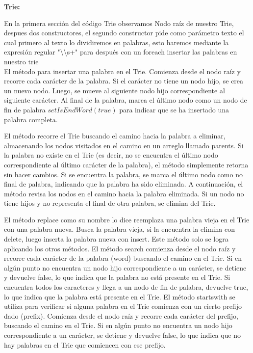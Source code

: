 \documentclass{article}
\begin{document}
	\begin{minipage}{\textwidth}	

		\textbf{Trie: }
		
		En la primera sección del código Trie observamos Nodo raíz de nuestro Trie, despues dos constructores, 
		el segundo constructor pide como parámetro texto el cual primero al texto lo dividiremos en palabras, 
		esto haremos mediante la expresión regular "\textbackslash\textbackslash s+" para después con un foreach insertar las palabras en nuestro trie
		\\El método para insertar una palabra en el Trie. Comienza desde el nodo raíz y recorre cada carácter de la palabra. 
		Si el carácter no tiene un nodo hijo, se crea un nuevo nodo. Luego, se mueve al siguiente nodo hijo correspondiente al 
		siguiente carácter. Al final de la palabra, marca el último nodo como un nodo de fin de palabra \(setIsEndWord(true)\) 
		para indicar que se ha insertado una palabra completa.
		
		\end{minipage}
		\clearpage
		
		El método recorre el Trie buscando el camino hacia la palabra a eliminar, almacenando los nodos visitados en el camino en un arreglo llamado parents. 
		Si la palabra no existe en el Trie (es decir, no se encuentra el último nodo correspondiente al último carácter de la palabra), el método simplemente 
		retorna sin hacer cambios. Si se encuentra la palabra, se marca el último nodo como no final de palabra, indicando que la palabra ha sido eliminada. 
		A continuación, el método revisa los nodos en el camino hacia la palabra eliminada. Si un nodo no tiene hijos y no representa el final de otra palabra, 
		se elimina del Trie.
		
		
		El método replace como su nombre lo dice reemplaza una palabra vieja en el Trie con una palabra nueva. Busca la palabra vieja, si la encuentra la elimina con delete, 
		luego inserta la palabra nueva con insert. Este método solo se logra aplicando los otros métodos.
		El método search comienza desde el nodo raíz y recorre cada carácter de la palabra (word) buscando el camino en el Trie. Si en algún punto no encuentra un nodo hijo 
		correspondiente a un carácter, se detiene y devuelve false, lo que indica que la palabra no está presente en el Trie. Si encuentra todos los caracteres y llega a un nodo 
		de fin de palabra, devuelve true, lo que indica que la palabra está presente en el Trie.
		El método startswith se utiliza para verificar si alguna palabra en el Trie comienza con un cierto prefijo dado (prefix). Comienza desde el nodo raíz y recorre cada 
		carácter del prefijo, buscando el camino en el Trie. Si en algún punto no encuentra un nodo hijo correspondiente a un carácter, se detiene y devuelve false, lo que 
		indica que no hay palabras en el Trie que comiencen con ese prefijo.
\end{document}
